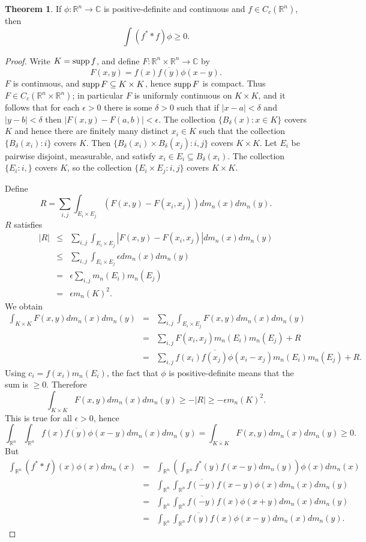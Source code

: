 \documentclass{article}
\newcommand{\supp}{\ensuremath\mathrm{supp}\,}
\theoremstyle{definition}
\newtheorem{theorem}{Theorem}
\theoremstyle{definition}
\begin{document}
\begin{theorem}
If $\phi:\mathbb{R}^n \to \mathbb{C}$ is positive-definite and continuous and $f \in C_c(\mathbb{R}^n)$, then
\[
\int (f^* * f) \phi \geq 0.
\]
\end{theorem}
\begin{proof}
Write $K=\supp f$, and
define $F:\mathbb{R}^n \times \mathbb{R}^n \to \mathbb{C}$ by 
\[
F(x,y)=f(x)\overline{f(y)} \phi(x-y).
\]
$F$ is continuous, and $\supp F \subseteq K \times K$, hence $\supp F$ is compact. Thus
$F \in C_c(\mathbb{R}^n \times \mathbb{R}^n)$; in particular $F$ is uniformly continuous on
$K \times K$, and it follows that  for each $\epsilon>0$ there is some $\delta>0$ such that 
if $|x-a|<\delta$ and $|y-b|<\delta$ then 
$|F(x,y)-F(a,b)|<\epsilon$. 
The collection $\{B_\delta(x) :x \in K\}$ covers
$K$ and hence 
there are finitely many distinct $x_i \in K$
such that
the collection $\{B_\delta(x_i): i\}$ covers $K$.
Then 
$\{B_\delta(x_i) \times B_\delta(x_j):i,j\}$ covers $K \times K$. 
Let $E_i$ be pairwise disjoint, measurable, and satisfy $x_i \in E_i  \subseteq B_\delta(x_i)$.
The collection $\{E_i:i,\}$
covers $K$, so the collection  
$\{E_i \times E_j:i,j\}$
covers $K \times K$. 

Define
\[
R =\sum_{i,j} \int_{E_i \times E_j}  (F(x,y)-F(x_i,x_j)) dm_n(x)dm_n(y).
\]
$R$ satisfies
\begin{eqnarray*}
|R|&\leq&\sum_{i,j} \int_{E_i \times E_j} | F(x,y)- F(x_i,x_j)| dm_n(x)dm_n(y)\\
&\leq&\sum_{i,j} \int_{E_i \times E_j} \epsilon dm_n(x)dm_n(y)\\
&=&\epsilon \sum_{i,j}m_n(E_i)m_n(E_j)\\
&=&\epsilon m_n(K)^2.
\end{eqnarray*}
We obtain
\begin{eqnarray*}
\int_{K \times K} F(x,y) dm_n(x) dm_n(y)&=&\sum_{i,j} \int_{E_i \times E_j} F(x,y) dm_n(x)dm_n(y)\\
&=&\sum_{i,j} F(x_i,x_j) m_n(E_i)m_n(E_j) +R\\
&=&\sum_{i,j} f(x_i)\overline{f(x_j)}\phi(x_i-x_j)m_n(E_i)m_n(E_j)+R.
\end{eqnarray*}
Using $c_i=f(x_i)m_n(E_i)$, the fact that $\phi$ is positive-definite means that the sum is $\geq 0$. Therefore
\[
\int_{K \times K} F(x,y) dm_n(x) dm_n(y) \geq -|R| \geq -\epsilon m_n(K)^2.
\]
This is true for all $\epsilon>0$, hence 
\[
\int_{\mathbb{R}^n} \int_{\mathbb{R}^n} f(x)\overline{f(y)} \phi(x-y) dm_n(x)dm_n(y) = \int_{K \times K}
F(x,y) dm_n(x)dm_n(y) \geq 0.
\]
But
\begin{eqnarray*}
\int_{\mathbb{R}^n} (f^* * f)(x) \phi(x) dm_n(x)&=&\int_{\mathbb{R}^n} \left(\int_{\mathbb{R}^n} f^*(y)f(x-y) dm_n(y)\right) \phi(x) dm_n(x)\\
&=&\int_{\mathbb{R}^n} \int_{\mathbb{R}^n} \overline{f(-y)} f(x-y) \phi(x) dm_n(x) dm_n(y)\\
&=&\int_{\mathbb{R}^n} \int_{\mathbb{R}^n}  \overline{f(-y)} f(x) \phi(x+y) dm_n(x)dm_n(y)\\
&=&\int_{\mathbb{R}^n} \int_{\mathbb{R}^n}  \overline{f(y)} f(x) \phi(x-y) dm_n(x)dm_n(y).
\end{eqnarray*}
\end{proof}
\end{document}
